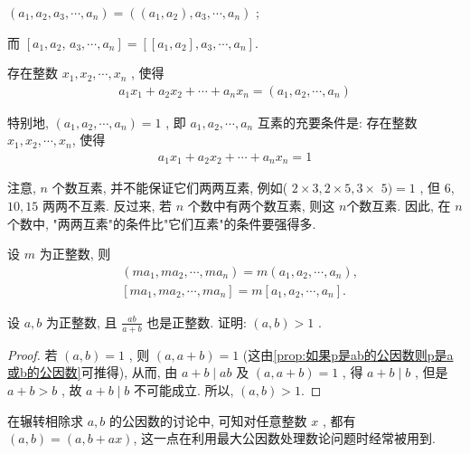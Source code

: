 \begin{property}
$\left(a_{1}, a_{2}, a_{3}, \cdots, a_{n}\right)=\left(\left(a_{1}, a_{2}\right), a_{3}, \cdots, a_{n}\right)$ ; 

而 $\left[a_{1}, a_{2}\right.$, $\left.a_{3}, \cdots, a_{n}\right]=\left[\left[a_{1}, a_{2}\right], a_{3}, \cdots, a_{n}\right]$.
\end{property}

\begin{property}
	存在整数 $x_{1}, x_{2}, \cdots, x_{n}$ , 使得
\begin{align*}
	a_{1} x_{1}+a_{2} x_{2}+\cdots+a_{n} x_{n}=\left(a_{1}, a_{2}, \cdots, a_{n}\right)
\end{align*}
\end{property}

特别地,  $\left(a_{1}, a_{2}, \cdots, a_{n}\right)=1$ , 即 $a_{1}, a_{2}, \cdots, a_{n}$ 互素的充要条件是: 存在整数 $x_{1}, x_{2}, \cdots, x_{n}$, 使得
\begin{align*}
	a_{1} x_{1}+a_{2} x_{2}+\cdots+a_{n} x_{n}=1
\end{align*}

注意,  $n$ 个数互素, 并不能保证它们两两互素, 例如( $2 \times 3,2 \times 5,3 \times$ $5 )=1$ , 但 6,  $10 ,  15$ 两两不互素. 反过来, 若 $n$ 个数中有两个数互素, 则这 $n$个数互素. 因此, 在 $n$ 个数中, "两两互素"的条件比"它们互素"的条件要强得多.

\begin{property}\label{prop:最大公因数与最小公倍数的可乘性}
	设 $m$ 为正整数, 则
	\begin{align}
	 & \left(m a_{1}, m a_{2}, \cdots, m a_{n}\right)=m\left(a_{1}, a_{2}, \cdots, a_{n}\right),   \\
	 & {\left[m a_{1}, m a_{2}, \cdots, m a_{n}\right]=m\left[a_{1}, a_{2}, \cdots, a_{n}\right]}.
\end{align}
\end{property}

\begin{example}
	设 $a ,  b$ 为正整数, 且 $\frac{a b}{a+b}$ 也是正整数. 证明:  $(a, b)>1$ .
\end{example}
\begin{proof}
若 $(a, b)=1$ , 则 $(a, a+b)=1$ (这由\autoref{prop:如果p是ab的公因数则p是a或b的公因数}可推得), 从而, 由 $a+b \mid a b$ 及 $(a, a+b)=1$ , 得 $a+b \mid b$ , 但是 $a+b>b$ , 故 $a+b \mid b$ 不可能成立. 所以,  $(a, b)>1$.
\end{proof}
\begin{note}
	在辗转相除求 $a ,  b$ 的公因数的讨论中, 可知对任意整数 $x$ , 都有 $(a, b)=(a, b+a x)$, 这一点在利用最大公因数处理数论问题时经常被用到.
\end{note}

